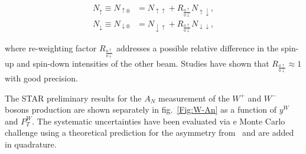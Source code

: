 \documentclass{PoS}
\begin{document}
\begin{align}
N_{\uparrow}   \equiv N_{\uparrow0}   &= N_{\uparrow\uparrow}   + R_{\frac{0\uparrow}{0\downarrow}} N_{\uparrow\downarrow},\\
N_{\downarrow} \equiv N_{\downarrow0} &= N_{\downarrow\uparrow} + R_{\frac{0\uparrow}{0\downarrow}} N_{\downarrow\downarrow},
\end{align}

\noindent
where re-weighting factor $R_{\frac{0\uparrow}{0\downarrow}}$ addresses a
possible relative difference in the spin-up and spin-down intensities of the
other beam. Studies have shown that $R_{\frac{0\uparrow}{0\downarrow}} \approx
1$ with good precision.


The STAR preliminary results for the $A_{N}$ measurement of the $W^{+}$ and $W^{-}$ bosons production are shown separately in fig.~\ref{Fig:W-An} as a function of $y^{W}$ and $P_{T}^{W}$. 
The systematic uncertainties have been evaluated via e Monte Carlo challenge using a theoretical prediction for the asymmetry from~\cite{Kang:2014} and are added in quadrature.
\end{document}
